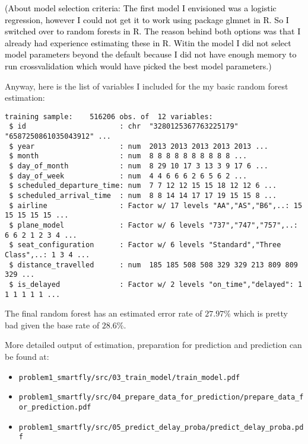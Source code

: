 \documentclass{article}\usepackage[]{graphicx}\usepackage[]{color}
\makeatletter
\newenvironment{kframe}{%
 \def\at@end@of@kframe{}%
 \ifinner\ifhmode%
  \def\at@end@of@kframe{\end{minipage}}%
  \begin{minipage}{\columnwidth}%
 \fi\fi%
 \def\FrameCommand##1{\hskip\@totalleftmargin \hskip-\fboxsep
 \colorbox{shadecolor}{##1}\hskip-\fboxsep
     \hskip-\linewidth \hskip-\@totalleftmargin \hskip\columnwidth}%
 \MakeFramed {\advance\hsize-\width
   \@totalleftmargin\z@ \linewidth\hsize
   \@setminipage}}%
 {\par\unskip\endMakeFramed%
 \at@end@of@kframe}
\newenvironment{knitrout}{}{} %
\makeatother
\begin{document}
\textcolor{black}{(About model selection criteria: The first model I envisioned was a logistic regression, however I could not get it to work using package glmnet in R. So I switched over to random forests in R. The reason behind both options was that I already had experience estimating these in R. Witin the model I did not select model parameters beyond the default because I did not have enough memory to run crossvalidation which would have picked the best model parameters.)}

Anyway, here is the list of variables I included for the my basic random forest estimation:

\begin{knitrout}
\color{fgcolor}\begin{kframe}
\begin{verbatim}
training sample:	516206 obs. of  12 variables:
 $ id                      : chr  "3280125367763225179" "6587250861035043912" ...
 $ year                    : num  2013 2013 2013 2013 2013 ...
 $ month                   : num  8 8 8 8 8 8 8 8 8 8 ...
 $ day_of_month            : num  8 29 10 17 3 13 3 9 17 6 ...
 $ day_of_week             : num  4 4 6 6 6 2 6 5 6 2 ...
 $ scheduled_departure_time: num  7 7 12 12 15 15 18 12 12 6 ...
 $ scheduled_arrival_time  : num  8 8 14 14 17 17 19 15 15 8 ...
 $ airline                 : Factor w/ 17 levels "AA","AS","B6",..: 15 15 15 15 15 ...
 $ plane_model             : Factor w/ 6 levels "737","747","757",..: 6 6 2 1 2 3 4 ...
 $ seat_configuration      : Factor w/ 6 levels "Standard","Three Class",..: 1 3 4 ...
 $ distance_travelled      : num  185 185 508 508 329 329 213 809 809 329 ...
 $ is_delayed              : Factor w/ 2 levels "on_time","delayed": 1 1 1 1 1 1 ...
\end{verbatim}
\end{kframe}
\end{knitrout}

The final random forest has an estimated error rate of $27.97\%$ which is pretty bad given the base rate of $28.6\%$.


More detailed output of estimation, preparation for prediction and prediction can be found at:
\begin{itemize}
	\item \verb+problem1_smartfly/src/03_train_model/train_model.pdf+
	\item \verb+problem1_smartfly/src/04_prepare_data_for_prediction/prepare_data_for_prediction.pdf+
	\item \verb+problem1_smartfly/src/05_predict_delay_proba/predict_delay_proba.pdf+
\end{itemize}
\end{document}
